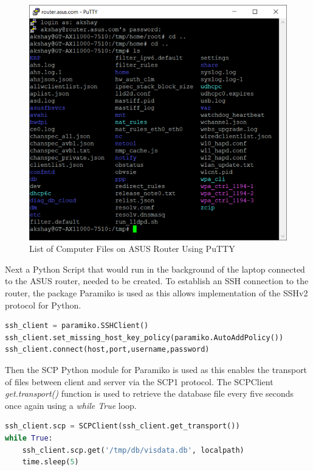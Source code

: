 \begin{figure}[ht]
    \centering
    \includegraphics[width=1\linewidth]{pages/Chapter4/Chapter 4 Images/PuttyFiles.png}
    \caption{List of Computer Files on ASUS Router Using PuTTY}
    \label{fig:PuttyAsusFiles}
\end{figure}

Next a Python Script that would run in the background of the laptop connected to the ASUS router, needed to be created. To establish an SSH connection to the router, the package Paramiko \cite{Paramiko} is used as this allows implementation of the SSHv2 protocol for Python.

\begin{lstlisting}[language=Python, caption={Paramiko SSH Client Python Code Snippet}, label={lst:paramiko}]
ssh_client = paramiko.SSHClient()
ssh_client.set_missing_host_key_policy(paramiko.AutoAddPolicy())
ssh_client.connect(host,port,username,password)
\end{lstlisting}

Then the SCP Python module \cite{scp} for Paramiko is used as this enables the transport of files between client and server via the SCP1 protocol. The SCPClient \textit{get.transport()} function is used to retrieve the database file every five seconds once again using a \textit{while True} loop.

\begin{lstlisting}[language=Python, caption={SCP Client Python Code Snippet For Data Retrieval}, label={lst:SCP}]
ssh_client.scp = SCPClient(ssh_client.get_transport())
while True:
    ssh_client.scp.get('/tmp/db/visdata.db', localpath)
    time.sleep(5)
\end{lstlisting}


